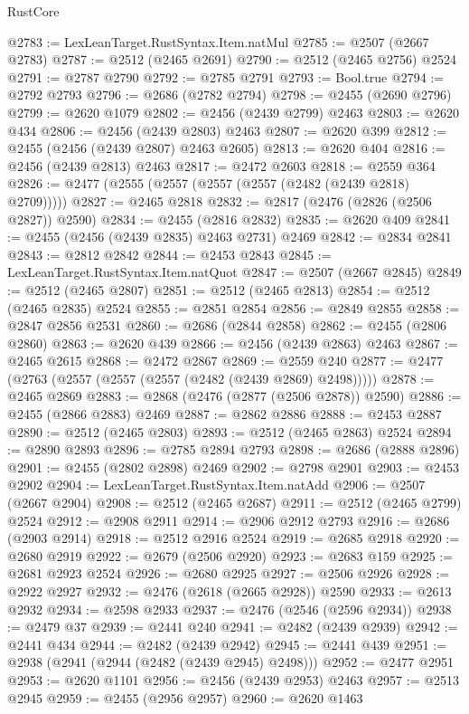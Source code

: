 \begin{lexlean}{RustCore}
\begin{coremodule}
@2783 := LexLeanTarget.RustSyntax.Item.natMul
@2785 := @2507 (@2667 @2783)
@2787 := @2512 (@2465 @2691)
@2790 := @2512 (@2465 @2756) @2524
@2791 := @2787 @2790
@2792 := @2785 @2791
@2793 := Bool.true
@2794 := @2792 @2793
@2796 := @2686 (@2782 @2794)
@2798 := @2455 (@2690 @2796)
@2799 := @2620 @1079
@2802 := @2456 (@2439 @2799) @2463
@2803 := @2620 @434
@2806 := @2456 (@2439 @2803) @2463
@2807 := @2620 @399
@2812 := @2455 (@2456 (@2439 @2807) @2463 @2605)
@2813 := @2620 @404
@2816 := @2456 (@2439 @2813) @2463
@2817 := @2472 @2603
@2818 := @2559 @364
@2826 := @2477 (@2555 (@2557 (@2557 (@2557 (@2482 (@2439 @2818) @2709)))))
@2827 := @2465 @2818
@2832 := @2817 (@2476 (@2826 (@2506 @2827)) @2590)
@2834 := @2455 (@2816 @2832)
@2835 := @2620 @409
@2841 := @2455 (@2456 (@2439 @2835) @2463 @2731) @2469
@2842 := @2834 @2841
@2843 := @2812 @2842
@2844 := @2453 @2843
@2845 := LexLeanTarget.RustSyntax.Item.natQuot
@2847 := @2507 (@2667 @2845)
@2849 := @2512 (@2465 @2807)
@2851 := @2512 (@2465 @2813)
@2854 := @2512 (@2465 @2835) @2524
@2855 := @2851 @2854
@2856 := @2849 @2855
@2858 := @2847 @2856 @2531
@2860 := @2686 (@2844 @2858)
@2862 := @2455 (@2806 @2860)
@2863 := @2620 @439
@2866 := @2456 (@2439 @2863) @2463
@2867 := @2465 @2615
@2868 := @2472 @2867
@2869 := @2559 @240
@2877 := @2477 (@2763 (@2557 (@2557 (@2557 (@2482 (@2439 @2869) @2498)))))
@2878 := @2465 @2869
@2883 := @2868 (@2476 (@2877 (@2506 @2878)) @2590)
@2886 := @2455 (@2866 @2883) @2469
@2887 := @2862 @2886
@2888 := @2453 @2887
@2890 := @2512 (@2465 @2803)
@2893 := @2512 (@2465 @2863) @2524
@2894 := @2890 @2893
@2896 := @2785 @2894 @2793
@2898 := @2686 (@2888 @2896)
@2901 := @2455 (@2802 @2898) @2469
@2902 := @2798 @2901
@2903 := @2453 @2902
@2904 := LexLeanTarget.RustSyntax.Item.natAdd
@2906 := @2507 (@2667 @2904)
@2908 := @2512 (@2465 @2687)
@2911 := @2512 (@2465 @2799) @2524
@2912 := @2908 @2911
@2914 := @2906 @2912 @2793
@2916 := @2686 (@2903 @2914)
@2918 := @2512 @2916 @2524
@2919 := @2685 @2918
@2920 := @2680 @2919
@2922 := @2679 (@2506 @2920)
@2923 := @2683 @159
@2925 := @2681 @2923 @2524
@2926 := @2680 @2925
@2927 := @2506 @2926
@2928 := @2922 @2927
@2932 := @2476 (@2618 (@2665 @2928)) @2590
@2933 := @2613 @2932
@2934 := @2598 @2933
@2937 := @2476 (@2546 (@2596 @2934))
@2938 := @2479 @37
@2939 := @2441 @240
@2941 := @2482 (@2439 @2939)
@2942 := @2441 @434
@2944 := @2482 (@2439 @2942)
@2945 := @2441 @439
@2951 := @2938 (@2941 (@2944 (@2482 (@2439 @2945) @2498)))
@2952 := @2477 @2951
@2953 := @2620 @1101
@2956 := @2456 (@2439 @2953) @2463
@2957 := @2513 @2945
@2959 := @2455 (@2956 @2957)
@2960 := @2620 @1463

\end{coremodule}
\end{lexlean}
